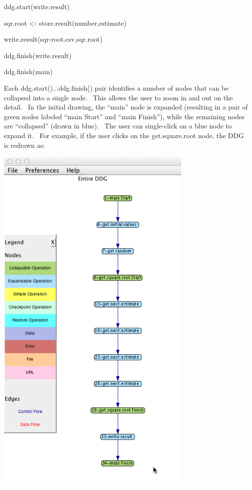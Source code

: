 \documentclass[letterpaper]{article}
\begin{document}
{\mdseries\upshape\color{black}
ddg.start({\textquotedbl}write.result{\textquotedbl})}

{\mdseries\upshape\color{black}
sqr.root {\textless}- store.result(number,estimate)}

{\mdseries\upshape\color{black}
write.result({\textquotedbl}sqr-root.csv{\textquotedbl},sqr.root)}

{\mdseries\upshape\color{black}
ddg.finish({\textquotedbl}write.result{\textquotedbl})}


\bigskip

{\mdseries\upshape\color{black}
ddg.finish({\textquotedbl}main{\textquotedbl})}

{\mdseries\upshape\color{black}
Each ddg.start()...ddg.finish() pair identifies a number of nodes that can be collapsed into a single node. \ This allows the user to zoom in and out on the detail. \ In the initial drawing, the “main” node is expanded (resulting in a pair of green nodes labeled “main Start” and “main Finish”), while the remaining nodes are “collapsed” (drawn in blue). \ The user can single-click on a blue node to expand it. \ For example, if the user clicks on the get.square.root node, the DDG is redrawn as:}

 \includegraphics[width=3.8083in,height=7.0835in]{UsingDDGExplorer-img/UsingDDGExplorer-img003.png} 
\end{document}
